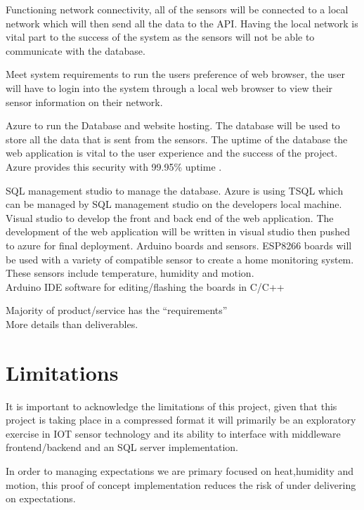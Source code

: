 \documentclass{article}
\begin{document}
        Functioning network connectivity, all of the sensors will be connected to a local network which will 
        then send all the data to the API. Having the local network is vital part to the success of the system 
        as the sensors will not be able to communicate with the database.
        \par
        Meet system requirements to run the users preference of web browser, the user will have to login into 
        the system through a local web browser to view their sensor information on their network.
        \vspace{5mm}

        Azure to run the Database and website hosting. The database will be used to store all the data that is 
        sent from the sensors. The uptime of the database the web application is vital to the user experience 
        and the success of the project. Azure provides this security with 99.95\% uptime \cite{AzureUptime}.
        \par
        SQL management studio to manage the database. Azure is using TSQL which can be managed by SQL management studio 
        on the developers local machine. Visual studio to develop the front and back end of the web application. 
        The development of the web application will be written in visual studio then pushed to azure for final deployment.
        Arduino boards and sensors. ESP8266 boards will be used with a variety of compatible sensor to create a home 
        monitoring system. These sensors include temperature, humidity and motion.\\
        Arduino IDE software for editing/flashing the boards in C/C++

    
        Majority of product/service has the “requirements”\\
        More details than deliverables.

    \section{Limitations}
        It is important to acknowledge the limitations of this project, given that this project is taking place 
        in a compressed format it will primarily be an exploratory exercise in IOT sensor technology and its 
        ability to interface with middleware frontend/backend and an SQL server implementation.
        \par
        In order to managing expectations we are primary focused on heat,humidity and motion, this proof of 
        concept implementation reduces the risk of under delivering on expectations.
\end{document}
